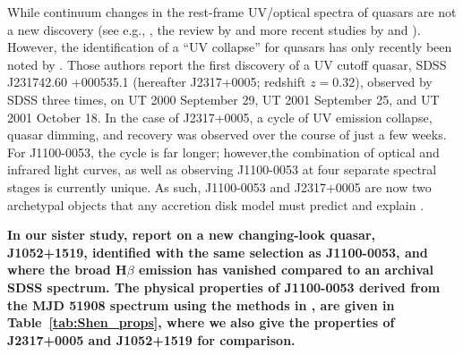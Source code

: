 \documentclass[a4paper,fleqn,usenatbib]{mnras}
\begin{document}
While continuum changes in the rest-frame UV/optical spectra of
quasars are not a new discovery (see e.g., \citealt{Clavel1991}, the
review by \citealt{Ulrich1997} and more recent studies by
\citealt{VandenBerk2004, Pereyra2006, MacLeod2010} and
\citealt{Guo2016b}). However, the identification of a ``UV collapse''
for quasars has only recently been noted by \cite{Guo2016}.  Those
authors report the first discovery of a UV cutoff quasar, SDSS
J231742.60 +000535.1 (hereafter J2317+0005; redshift $z = 0.32$),
observed by SDSS three times, on UT 2000 September 29, UT 2001
September 25, and UT 2001 October 18. In the case of J2317+0005, a
cycle of UV emission collapse, quasar dimming, and recovery was
observed over the course of just a few weeks. For J1100-0053, the
cycle is far longer; however,the combination of optical and infrared
light curves, as well as observing J1100-0053 at four separate
spectral stages is currently unique. As such, J1100-0053 and
J2317+0005 are now two archetypal objects that any accretion disk
model must predict and explain \citep[e.g.,][]{Lawrence2018}.

{\bf In our sister study, \citet{Stern2018} report on a new
changing-look quasar, J1052+1519, identified with the same selection
as J1100-0053, and where the broad H$\beta$ emission has vanished
compared to an archival SDSS spectrum. The physical properties of
J1100-0053 derived from the MJD 51908 spectrum using the methods in
\citet{Shen2011}, are given in Table~\ref{tab:Shen_props}, where we
also give the properties of J2317+0005 \citep{Guo2016} and J1052+1519
\citep{Stern2018} for comparison.}
\end{document}
